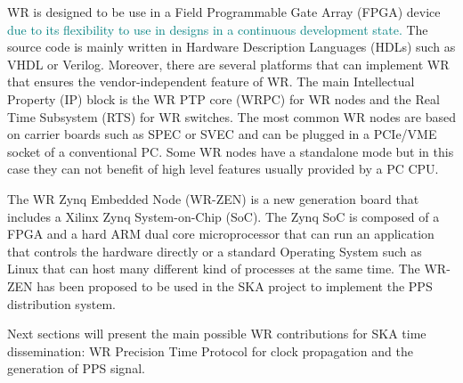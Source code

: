 
WR is designed to be use  in a Field Programmable Gate Array (FPGA) device \textcolor{teal}{due to its flexibility to use in designs in a continuous development state.}  The source code is mainly written in Hardware Description Languages (HDLs) such as VHDL or Verilog. Moreover, there are several platforms that can implement WR that ensures the vendor-independent feature of WR. The main Intellectual Property (IP) block is the WR PTP core (WRPC) for WR nodes and the Real Time Subsystem (RTS) for WR switches. The most common WR nodes are based on carrier boards such as SPEC or SVEC and can be plugged in a PCIe/VME socket of a conventional PC. Some WR nodes have a standalone mode but in this case they can not benefit of high level features usually provided by a PC CPU.


The WR Zynq Embedded Node (WR-ZEN) is a new generation board that includes a Xilinx Zynq System-on-Chip (SoC). The Zynq SoC is composed of a FPGA and a hard ARM dual core microprocessor that can run an application that controls the hardware directly or a standard Operating System such as Linux that can host many different kind of processes at the same time. The WR-ZEN has been proposed to be used in the SKA project to implement the PPS distribution system.

Next sections will present the main possible WR contributions for SKA time dissemination: WR Precision Time Protocol for clock propagation and the generation of PPS signal. 
